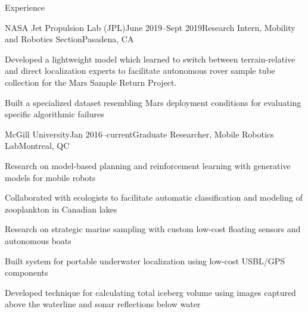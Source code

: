 \documentclass{resume} %
\begin{document}

\begin{rSection}{Experience}

\begin{rSubsection}{NASA Jet Propulsion Lab (JPL)}{June 2019--Sept 2019}{Research Intern, Mobility and Robotics Section}{Pasadena, CA}
\item{Developed a lightweight model which learned to switch between terrain-relative and direct localization experts to facilitate autonomous rover sample tube collection for the Mars Sample Return Project.}
\item{Built a specialized dataset resembling Mars deployment conditions for evaluating specific algorithmic failures}
\end{rSubsection}

\begin{rSubsection}{McGill University}{Jan 2016--current}{Graduate Researcher, Mobile Robotics Lab}{Montreal, QC}
\item{Research on model-based planning and reinforcement learning with generative models for mobile robots}
\item{Collaborated with ecologists to facilitate automatic classification and modeling of zooplankton in Canadian lakes}
\item{Research on strategic marine sampling with custom low-cost floating sensors and autonomous boats}
\item{Built system for portable underwater localization using low-cost USBL/GPS components} 
\item{Developed technique for calculating total iceberg volume using images captured above the  waterline and sonar reflections below water}
\end{rSubsection}


\end{rSection}
\end{document}
